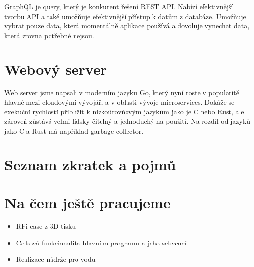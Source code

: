 \documentclass[11pt,a4paper]{article}
\begin{document}
GraphQL je query, který je konkurent řešení REST API. Nabízí efektivnější tvorbu API a také umožňuje efektivnější přístup k datům z databáze. Umožňuje vybrat pouze data, která momentálně aplikace používá a dovoluje vynechat data, která zrovna potřebné nejsou.

\section*{Webový server}

Web server jsme napsali v moderním jazyku Go, který nyní roste v popularitě hlavně mezi cloudovými vývojáři a v oblasti vývoje microservices. Dokáže se exekuční rychlostí přiblížit k nízkoúrovňovým jazykům jako je C nebo Rust, ale zároveň zůstává velmi lidsky čitelný a jednoduchý na použití. Na rozdíl od jazyků jako C a Rust má například garbage collector.

\section*{Seznam zkratek a pojmů}

\section*{Na čem ještě pracujeme}

\begin{itemize}
  \item RPi case z 3D tisku
  \item Celková funkcionalita hlavního programu a jeho sekvencí
  \item Realizace nádrže pro vodu
\end{itemize}

\clearpage

\begin{acronym}
\end{acronym}
\end{document}
